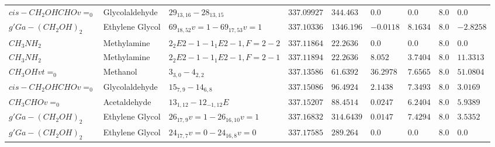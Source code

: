 \documentclass[10pt]{article}
\begin{document}
\begin{table}[htb]
\begin{tabular}{l l l l l l l l l}
$cis-CH_{2}OHCHOv=_{0}$ & Glycolaldehyde & $29_{13,16}-28_{13,15}$ & $337.09927$ & $344.463$ & $0.0$ & $0.0$ & $8.0$ & $0.0$\\
$g'Ga-(CH_{2}OH)_{2}$ & Ethylene Glycol & $69_{18,52}v=1-69_{17,53}v=1$ & $337.10336$ & $1346.196$ & $-0.0118$ & $8.1634$ & $8.0$ & $-2.8258$\\
$CH_{3}NH_{2}$ & Methylamine & $2_{2}E2-1-1_{1}E2-1,F=2-2$ & $337.11864$ & $22.2636$ & $0.0$ & $0.0$ & $8.0$ & $0.0$\\
$CH_{3}NH_{2}$ & Methylamine & $2_{2}E2-1-1_{1}E2-1,F=2-1$ & $337.11894$ & $22.2636$ & $8.052$ & $3.7404$ & $8.0$ & $11.3313$\\
$CH_{3}OHvt=_{0}$ & Methanol & $3_{3,0}-4_{2,2}$ & $337.13586$ & $61.6392$ & $36.2978$ & $7.6565$ & $8.0$ & $51.0804$\\
$cis-CH_{2}OHCHOv=_{0}$ & Glycolaldehyde & $15_{7,9}-14_{6,8}$ & $337.15086$ & $96.4924$ & $2.1438$ & $7.3493$ & $8.0$ & $3.0169$\\
$CH_{3}CHOv=_{0}$ & Acetaldehyde & $13_{1,12}-12_{-1,12}E$ & $337.15207$ & $88.4514$ & $0.0247$ & $6.2404$ & $8.0$ & $5.9389$\\
$g'Ga-(CH_{2}OH)_{2}$ & Ethylene Glycol & $26_{17,9}v=1-26_{16,10}v=1$ & $337.16832$ & $314.6439$ & $0.0147$ & $7.4294$ & $8.0$ & $3.5352$\\
$g'Ga-(CH_{2}OH)_{2}$ & Ethylene Glycol & $24_{17,7}v=0-24_{16,8}v=0$ & $337.17585$ & $289.264$ & $0.0$ & $0.0$ & $8.0$ & $0.0$\\
\hline
                
    \end{tabular}
\end{table}
\end{document}
